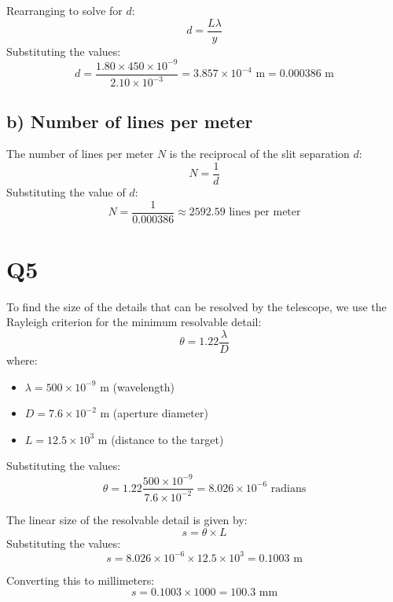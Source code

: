 \documentclass{article}
\begin{document}
Rearranging to solve for \( d \):
\[
d = \frac{L \lambda}{y}
\]
Substituting the values:
\[
d = \frac{1.80 \times 450 \times 10^{-9}}{2.10 \times 10^{-3}} = 3.857 \times 10^{-4} \text{ m} = 0.000386 \text{ m}
\]

\subsection*{b) Number of lines per meter}
The number of lines per meter \( N \) is the reciprocal of the slit separation \( d \):
\[
N = \frac{1}{d}
\]
Substituting the value of \( d \):
\[
N = \frac{1}{0.000386} \approx 2592.59 \text{ lines per meter}
\]


\section{Q5}
To find the size of the details that can be resolved by the telescope, we use the Rayleigh criterion for the minimum resolvable detail:
\[
\theta = 1.22 \frac{\lambda}{D}
\]
where:
\begin{itemize}
    \item \( \lambda = 500 \times 10^{-9} \text{ m} \) (wavelength)
    \item \( D = 7.6 \times 10^{-2} \text{ m} \) (aperture diameter)
    \item \( L = 12.5 \times 10^{3} \text{ m} \) (distance to the target)
\end{itemize}

Substituting the values:
\[
\theta = 1.22 \frac{500 \times 10^{-9}}{7.6 \times 10^{-2}} = 8.026 \times 10^{-6} \text{ radians}
\]

The linear size of the resolvable detail is given by:
\[
s = \theta \times L
\]
Substituting the values:
\[
s = 8.026 \times 10^{-6} \times 12.5 \times 10^{3} = 0.1003 \text{ m}
\]

Converting this to millimeters:
\[
s = 0.1003 \times 1000 = 100.3 \text{ mm}
\]
\end{document}
